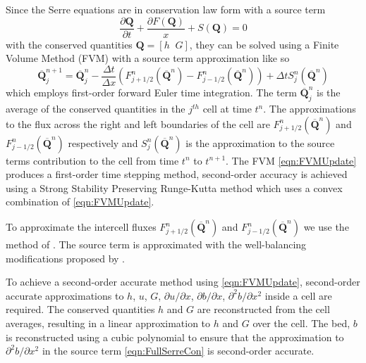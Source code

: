 \documentclass[times]{elsarticle}
\newcommand{\vecn}[1]{\boldsymbol{#1}}
\begin{document}
Since the Serre equations are in conservation law form with a source term
\begin{equation*}
\frac{\partial \vecn{Q} }{\partial t} + \frac{\partial F(\vecn{Q} )}{x} + S(\vecn{Q} ) = 0
\end{equation*}
with the conserved quantities $\vecn{Q}  = \left[h \; \; G\right]$, they can be solved using a Finite Volume Method (FVM) with a source term approximation like so
\begin{equation}
\label{eqn:FVMUpdate}
\overline{\vecn{Q} }^{n+1}_j = \overline{\vecn{Q} }^{n}_j - \frac{\Delta t}{\Delta x} \left(F^n_{j+1/2}\left(\overline{\vecn{Q} }^{n} \right) - F^n_{j-1/2}\left(\overline{\vecn{Q} }^{n} \right) \right) + \Delta t S^n_j\left(\overline{\vecn{Q} }^{n} \right)
\end{equation}
which employs first-order forward Euler time integration. The term $\overline{\vecn{Q} }^{n}_j $ is the average of the conserved quantities in the $j^{th}$ cell at time $t^n$. The approximations to the flux across the right and left boundaries of the cell are $F^n_{j+1/2}\left(\overline{\vecn{Q} }^{n} \right)$ and $ F^n_{j-1/2}\left(\overline{\vecn{Q} }^{n} \right)$ respectively and $S^n_j\left(\overline{\vecn{Q} }^{n} \right)$ is the approximation to the source terms contribution to the cell from time $t^n$ to $t^{n+1}$. The FVM \eqref{eqn:FVMUpdate} produces a first-order time stepping method, second-order accuracy is achieved using a Strong Stability Preserving Runge-Kutta method \cite{Gottlieb-etal-2003-89} which uses a convex combination of \eqref{eqn:FVMUpdate}.

To approximate the intercell fluxes $F^n_{j+1/2}\left(\overline{\vecn{Q} }^{n} \right)$ and $F^n_{j-1/2}\left(\overline{\vecn{Q} }^{n} \right)$ we use the method of \citet{Kurganov-etal-2001-707}. The source term is approximated with the well-balancing modifications proposed by \citet{Klein-etal-2004-2050}.

To achieve a second-order accurate method using \eqref{eqn:FVMUpdate}, second-order accurate approximations to $h$, $u$, $G$, $\partial u / \partial x$, $\partial b / \partial x$, $\partial^2 b / \partial x^2$ inside a cell are required. The conserved quantities $h$ and $G$ are reconstructed from the cell averages, resulting in a linear approximation to $h$ and $G$ over the cell. The bed, $b$ is reconstructed using a cubic polynomial to ensure that the approximation to $\partial^2 b / \partial x^2$ in the source term \eqref{eqn:FullSerreCon} is second-order accurate. 
\end{document}
